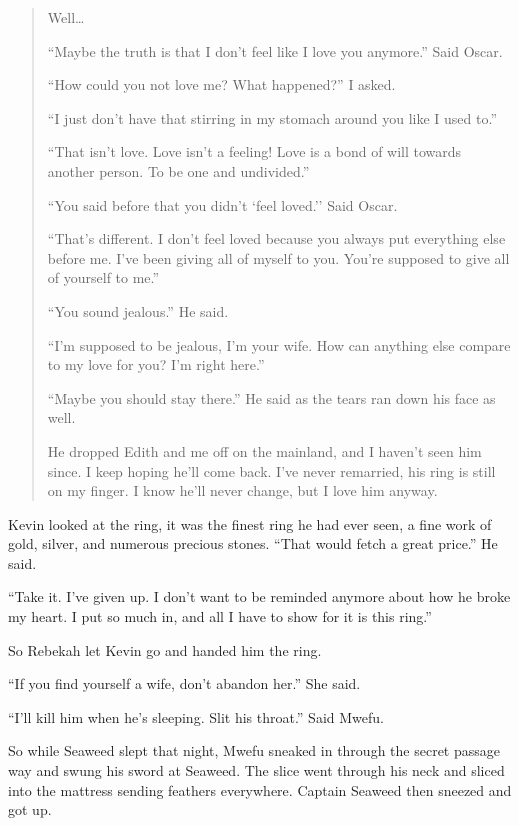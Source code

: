 \begin{quote}

Well\ldots

``Maybe the truth is that I don't feel like I love you anymore.'' Said Oscar.

``How could you not love me? What happened?'' I asked.

``I just don't have that stirring in my stomach around you like I used to.''

``That isn't love. Love isn't a feeling! Love is a bond of will towards another person. To be one and undivided.''

``You said before that you didn't `feel loved.'' Said Oscar.

``That's different. I don't feel loved because you always put everything else before me. I've been giving all of myself to you. You're supposed to give all of yourself to me.''

``You sound jealous.'' He said.

``I'm supposed to be jealous, I'm your wife. How can anything else compare to my love for you? I'm right here.''

``Maybe you should stay there.'' He said as the tears ran down his face as well.

He dropped Edith and me off on the mainland, and I haven't seen him since. I keep hoping he'll come back. I've never remarried, his ring is still on my finger. I know he'll never change, but I love him anyway.

\end{quote}

Kevin looked at the ring, it was the finest ring he had ever seen, a fine work of gold, silver, and numerous precious stones.
``That would fetch a great price.'' He said.

``Take it. I've given up. I don't want to be reminded anymore about how he broke my heart. I put so much in, and all I have to show for it is this ring.''

So Rebekah let Kevin go and handed him the ring.

``If you find yourself a wife, don't abandon her.'' She said.

\tbreak

``I'll kill him when he's sleeping. Slit his throat.'' Said Mwefu.

So while Seaweed slept that night, Mwefu sneaked in through the secret passage way and swung his sword at Seaweed.
The slice went through his neck and sliced into the mattress sending feathers everywhere. Captain Seaweed then sneezed and got up.

